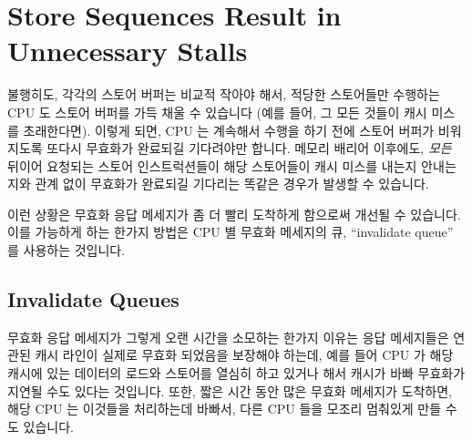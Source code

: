 \section{Store Sequences Result in Unnecessary Stalls}
\label{sec:app:whymb:Store Sequences Result in Unnecessary Stalls}

불행히도, 각각의 스토어 버퍼는 비교적 작아야 해서, 적당한 스토어들만 수행하는
CPU 도 스토어 버퍼를 가득 채울 수 있습니다 (예를 들어, 그 모든 것들이 캐시
미스를 초래한다면).
이렇게 되면, CPU 는 계속해서 수행을 하기 전에 스토어 버퍼가 비워지도록 또다시
무효화가 완료되길 기다려야만 합니다.
메모리 배리어 이후에도, \emph{모든} 뒤이어 요청되는 스토어 인스트럭션들이 해당
스토어들이 캐시 미스를 내는지 안내는지와 관계 없이 무효화가 완료되길 기다리는
똑같은 경우가 발생할 수 있습니다.

이런 상황은 무효화 응답 메세지가 좀 더 빨리 도착하게 함으로써 개선될 수
있습니다.
이를 가능하게 하는 한가지 방법은 CPU 별 무효화 메세지의 큐, ``invalidate
queue'' 를 사용하는 것입니다.

\subsection{Invalidate Queues}
\label{sec:app:whymb:Invalidate Queues}

무효화 응답 메세지가 그렇게 오랜 시간을 소모하는 한가지 이유는 응답 메세지들은
연관된 캐시 라인이 실제로 무효화 되었음을 보장해야 하는데, 예를 들어 CPU 가
해당 캐시에 있는 데이터의 로드와 스토어를 열심히 하고 있거나 해서 캐시가 바빠
무효화가 지연될 수도 있다는 것입니다.
또한, 짧은 시간 동안 많은 무효화 메세지가 도착하면, 해당 CPU 는 이것들을
처리하는데 바빠서, 다른 CPU 들을 모조리 멈춰있게 만들 수도 있습니다.


